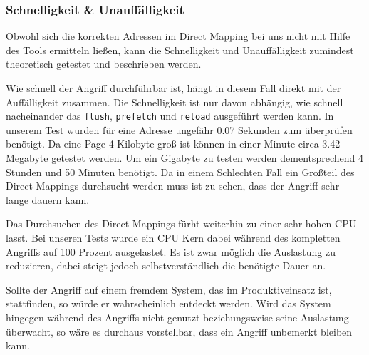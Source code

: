 \subsubsection{Schnelligkeit \& Unauffälligkeit}
Obwohl sich die korrekten Adressen im Direct Mapping bei uns nicht mit Hilfe des Tools ermitteln ließen, kann die Schnelligkeit und Unauffälligkeit zumindest theoretisch getestet und beschrieben werden.

Wie schnell der Angriff durchführbar ist, hängt in diesem Fall direkt mit der Auffälligkeit zusammen. Die Schnelligkeit ist nur davon abhängig, wie schnell nacheinander das \texttt{flush}, \texttt{prefetch} und \texttt{reload} ausgeführt werden kann. In unserem Test wurden für eine Adresse ungefähr 0.07 Sekunden zum überprüfen benötigt. Da eine Page 4 Kilobyte groß ist können in einer Minute circa 3.42 Megabyte getestet werden. Um ein Gigabyte zu testen werden dementsprechend 4 Stunden und 50 Minuten benötigt. Da in einem Schlechten Fall ein Großteil des Direct Mappings durchsucht werden muss ist zu sehen, dass der Angriff sehr lange dauern kann.

Das Durchsuchen des Direct Mappings fürht weiterhin zu einer sehr hohen CPU lasst. Bei unseren Tests wurde ein CPU Kern dabei während des kompletten Angriffs auf 100 Prozent ausgelastet. Es ist zwar möglich die Auslastung zu reduzieren, dabei steigt jedoch selbstverständlich die benötigte Dauer an.

Sollte der Angriff auf einem fremdem System, das im Produktiveinsatz ist, stattfinden, so würde er wahrscheinlich entdeckt werden. Wird das System hingegen während des Angriffs nicht genutzt beziehungsweise seine Auslastung überwacht, so wäre es durchaus vorstellbar, dass ein Angriff unbemerkt bleiben kann.



